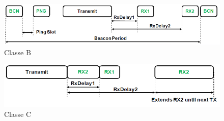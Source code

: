 \documentclass[12pt,a4paper,openright,twoside]{report}
\begin{document}
\begin{figure}[h]                      
\begin{center} 
\includegraphics[width=\textwidth]{CLASSE_B_receive-window.png} 
\caption[LoRa device classe B]{ Classe B}\label{fig:venti}
\end{center}
\end{figure}


\begin{figure}[h]                      
\begin{center} 
\includegraphics[width=\textwidth]{CLASSE_C_receive-window.png} 
\caption[LoRa device classe C]{ Classe C}\label{fig:venti}
\end{center}
\end{figure}
\end{document}
